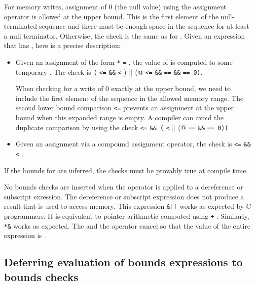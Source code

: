 For memory writes, assignment of 0 (the null value)
using the assignment operator is allowed at the upper bound.
This is the first element of the null-terminated sequence
and there must be enough space in the sequence for at least a null terminator.
Otherwise, the check
is the same as for \arrayptr.   Given an expression {} that
has {}, here is a precise description:
\begin{itemize}
\item Given an assignment of the form \lstinline|*| \lstinline|=| , the
value of  is computed to some temporary .  The
check is \lstinline|(| \lstinline|<=|  \lstinline|&&|  \lstinline|<| 
\lstinline@) || (@  \lstinline|<=|  \lstinline|&&|  
\lstinline|==|  \lstinline|&&|  \lstinline|== 0)|.

When checking for a write of 0 exactly at the upper bound, we need
to include the first element of the sequence in the allowed memory range.
The second lower bound comparison  \lstinline|<=| 
prevents an assignment
at the upper bound when this expanded range is empty.
A compiler can avoid the duplicate comparison by using
the check
 \lstinline|<=|  \lstinline|&& (| \lstinline|<| 
\lstinline@|| (@ \lstinline|==|  \lstinline|&&|  \lstinline|== 0))|
\item Given an assignment via a compound assignment operator, the check
is  \lstinline|<=|  \lstinline|&&|  \lstinline|<| .
\end{itemize}

If the bounds for  are inferred, the checks
must be provably true at compile time.

No bounds checks are inserted when the \code{&} operator is applied to
a dereference or subscript exression.
The dereference or subscript expression does not produce a result that is used
to access memory.  This expression \lstinline|&|\lstinline|[|\lstinline|]|
works as expected by C programmers.  It is equivalent to pointer arithmetic computed using
 \lstinline|+| .   Similarly, \lstinline|*&| works
as expected.  The \code{&} and the \code{*} operator cancel so that
the value of the entire expression is .

\subsection{Deferring evaluation of bounds expressions to bounds checks}

